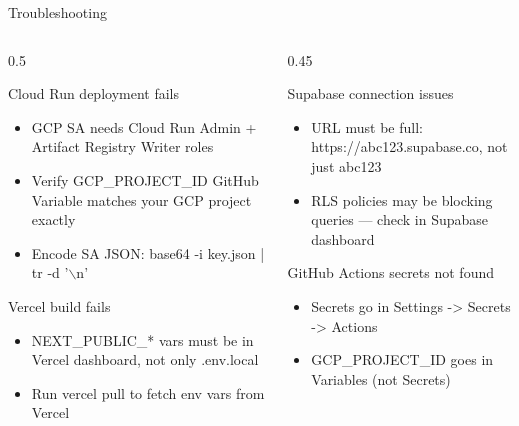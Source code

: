 \documentclass[10pt,aspectratio=169,t]{beamer}
\begin{document}
\begin{frame}{Troubleshooting}

  \begin{columns}

    \begin{column}{0.5\paperwidth}

      \begin{block}{Cloud Run deployment fails}
        \begin{itemize}
          \item GCP SA needs Cloud Run Admin + Artifact Registry Writer roles
          \item Verify GCP\_PROJECT\_ID GitHub Variable matches your GCP project exactly
          \item Encode SA JSON: base64 -i key.json | tr -d '$\backslash$n'
        \end{itemize}
      \end{block}

      \begin{block}{Vercel build fails}
        \begin{itemize}
          \item NEXT\_PUBLIC\_* vars must be in Vercel dashboard, not only .env.local
          \item Run vercel pull to fetch env vars from Vercel
        \end{itemize}
      \end{block}

    \end{column}

    \begin{column}{0.45\paperwidth}

      \begin{block}{Supabase connection issues}
        \begin{itemize}
          \item URL must be full: https://abc123.supabase.co, not just abc123
          \item RLS policies may be blocking queries --- check in Supabase dashboard
        \end{itemize}
      \end{block}

      \begin{block}{GitHub Actions secrets not found}
        \begin{itemize}
          \item Secrets go in Settings -> Secrets -> Actions
          \item GCP\_PROJECT\_ID goes in Variables (not Secrets)
        \end{itemize}
      \end{block}

    \end{column}

  \end{columns}

\end{frame}
\end{document}
